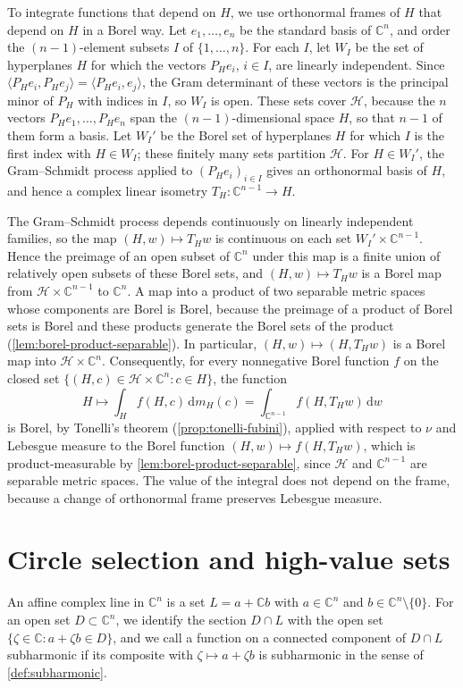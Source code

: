 To integrate functions that depend on $H$, we use orthonormal frames of $H$ that depend on $H$ in a Borel way. Let $e_1,\ldots,e_n$ be the standard basis of $\mathbb C^n$, and order the $(n-1)$-element subsets $I$ of $\{1,\ldots,n\}$. For each $I$, let $W_I$ be the set of hyperplanes $H$ for which the vectors $P_He_i$, $i\in I$, are linearly independent. Since $\langle P_He_i,P_He_j\rangle=\langle P_He_i,e_j\rangle$, the Gram determinant of these vectors is the principal minor of $P_H$ with indices in $I$, so $W_I$ is open. These sets cover $\mathcal H$, because the $n$ vectors $P_He_1,\ldots,P_He_n$ span the $(n-1)$-dimensional space $H$, so that $n-1$ of them form a basis. Let $W_I'$ be the Borel set of hyperplanes $H$ for which $I$ is the first index with $H\in W_I$; these finitely many sets partition $\mathcal H$. For $H\in W_I'$, the Gram--Schmidt process applied to $(P_He_i)_{i\in I}$ gives an orthonormal basis of $H$, and hence a complex linear isometry $T_H\colon\mathbb C^{n-1}\to H$.

The Gram--Schmidt process depends continuously on linearly independent families, so the map $(H,w)\mapsto T_Hw$ is continuous on each set $W_I'\times\mathbb C^{n-1}$. Hence the preimage of an open subset of $\mathbb C^n$ under this map is a finite union of relatively open subsets of these Borel sets, and $(H,w)\mapsto T_Hw$ is a Borel map from $\mathcal H\times\mathbb C^{n-1}$ to $\mathbb C^n$. A map into a product of two separable metric spaces whose components are Borel is Borel, because the preimage of a product of Borel sets is Borel and these products generate the Borel sets of the product (\cref{lem:borel-product-separable}). In particular, $(H,w)\mapsto(H,T_Hw)$ is a Borel map into $\mathcal H\times\mathbb C^n$. Consequently, for every nonnegative Borel function $f$ on the closed set $\{(H,c)\in\mathcal H\times\mathbb C^n:c\in H\}$, the function
\[
 H\longmapsto\int_Hf(H,c)\,\mathrm d m_H(c)=\int_{\mathbb C^{n-1}}f(H,T_Hw)\,\mathrm d w
\]
is Borel, by Tonelli's theorem (\cref{prop:tonelli-fubini}), applied with respect to $\nu$ and Lebesgue measure to the Borel function $(H,w)\mapsto f(H,T_Hw)$, which is product-measurable by \cref{lem:borel-product-separable}, since $\mathcal H$ and $\mathbb C^{n-1}$ are separable metric spaces. The value of the integral does not depend on the frame, because a change of orthonormal frame preserves Lebesgue measure.

\section{Circle selection and high-value sets}
\label{sec:high-value-stars}
An affine complex line in $\mathbb C^n$ is a set $L=a+\mathbb Cb$ with $a\in\mathbb C^n$ and $b\in\mathbb C^n\setminus\{0\}$. For an open set $D\subset\mathbb C^n$, we identify the section $D\cap L$ with the open set $\{\zeta\in\mathbb C:a+\zeta b\in D\}$, and we call a function on a connected component of $D\cap L$ subharmonic if its composite with $\zeta\mapsto a+\zeta b$ is subharmonic in the sense of \cref{def:subharmonic}.


